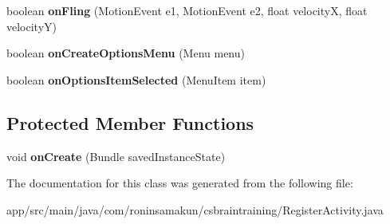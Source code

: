\begin{DoxyCompactItemize}
\item 
boolean {\bfseries on\+Fling} (Motion\+Event e1, Motion\+Event e2, float velocity\+X, float velocity\+Y)\label{classcom_1_1roninsamakun_1_1csbraintraining_1_1_register_activity_a462365d3aed771b8d3fff8c34da47687}

\item 
boolean {\bfseries on\+Create\+Options\+Menu} (Menu menu)\label{classcom_1_1roninsamakun_1_1csbraintraining_1_1_register_activity_ab63e7a462b90401be04e85c232681de8}

\item 
boolean {\bfseries on\+Options\+Item\+Selected} (Menu\+Item item)\label{classcom_1_1roninsamakun_1_1csbraintraining_1_1_register_activity_a6e14165a3483a9253cf0588c88cc1701}

\end{DoxyCompactItemize}
\subsection*{Protected Member Functions}
\begin{DoxyCompactItemize}
\item 
void {\bfseries on\+Create} (Bundle saved\+Instance\+State)\label{classcom_1_1roninsamakun_1_1csbraintraining_1_1_register_activity_a923ba1a910548ddc72ecbd9ecf913879}

\end{DoxyCompactItemize}


The documentation for this class was generated from the following file\+:\begin{DoxyCompactItemize}
\item 
app/src/main/java/com/roninsamakun/csbraintraining/Register\+Activity.\+java\end{DoxyCompactItemize}
